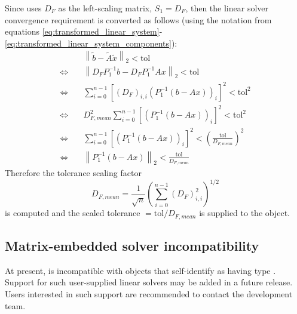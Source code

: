 Since {\kinsol} uses $D_F$ as the left-scaling matrix, $S_1 = D_F$,
then the linear solver convergence requirement is converted as follows
(using the notation from equations
\eqref{eq:transformed_linear_system}-\eqref{eq:transformed_linear_system_components}):
\begin{align*}
  &\left\| \tilde{b} - \tilde{A} \tilde{x} \right\|_2  <  \text{tol}\\
  \Leftrightarrow \quad & \left\| D_F P_1^{-1} b - D_F P_1^{-1} A x \right\|_2  <  \text{tol}\\
  \Leftrightarrow \quad & \sum_{i=0}^{n-1} \left[(D_F)_{i,i} \left(P_1^{-1} (b - A x)\right)_i\right]^2  <  \text{tol}^2\\
  \Leftrightarrow \quad & D_{F,mean}^2 \sum_{i=0}^{n-1} \left[\left(P_1^{-1} (b - A x)\right)_i\right]^2  <  \text{tol}^2\\
  \Leftrightarrow \quad & \sum_{i=0}^{n-1} \left[\left(P_1^{-1} (b - A x)\right)_i\right]^2  <  \left(\frac{\text{tol}}{D_{F,mean}}\right)^2\\
  \Leftrightarrow \quad & \left\| P_1^{-1} (b - A x)\right\|_2  <  \frac{\text{tol}}{D_{F,mean}}
\end{align*}
Therefore the tolerance scaling factor
\[
  D_{F,mean} = \frac{1}{\sqrt{n}}\left(\sum_{i=0}^{n-1} (D_F)_{i,i}^2\right)^{1/2}
\]
is computed and the scaled tolerance $= \text{tol} / D_{F,mean}$ is
supplied to the {\sunlinsol} object.

\subsection{Matrix-embedded solver incompatibility}
\label{ss:sunlinsol_matrix_embedded}

At present, {\kinls} is incompatible with {\sunlinsol} objects that self-identify as having type
.  Support for such user-supplied linear solvers may be 
added in a future release.  Users interested in such support are recommended to contact the 
{\sundials} development team.

















